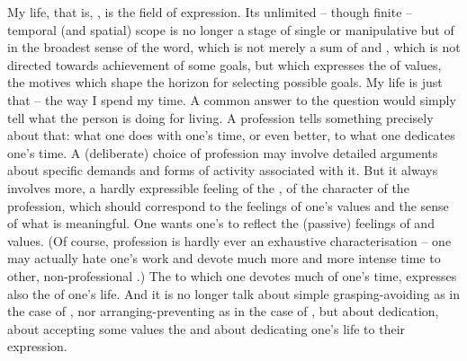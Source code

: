 
\pa\label{pa:Zweck} {My life}, that is, , is the field of 
expression.  Its unlimited -- though finite -- temporal (and spatial) scope is
no longer a stage of single  or manipulative  but of
 in the broadest sense of the word,  which is not
merely a sum of  and , which is not directed towards
achievement of some goals, but which expresses the  of values, the
motives which shape the horizon for selecting possible goals. {My life} is just that -- the way I
spend my time.  A common answer to the question  would simply
tell what the person is doing for living.  A profession tells something
precisely about that: what one does with one's time, or even better, to what one
dedicates one's time.  A (deliberate) choice of profession
 may involve detailed arguments about specific demands and forms of
activity associated with it.  But it always involves more, a hardly expressible
feeling of the , of the character of the profession, which should
correspond to the feelings of one's values and the sense of what is meaningful.
One wants one's  to reflect the (passive) feelings of
 and values.  (Of course, profession is hardly ever an exhaustive
characterisation -- one may actually hate one's work and devote much more and
more intense time to other, non-professional .)  The
 to which one devotes much of one's time, expresses also the
 of one's life.  And it is no longer talk about simple
grasping-avoiding as in the case of , nor arranging-preventing as in
the case of , but about dedication, about accepting some values
 the  and about dedicating one's life to their
expression.

